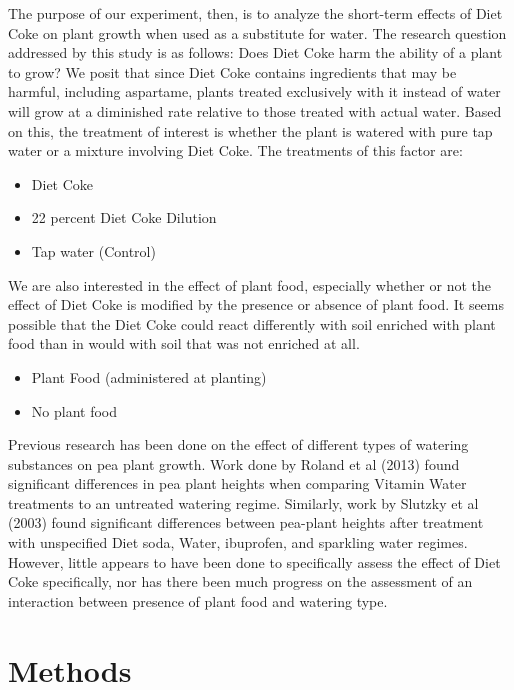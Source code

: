 \documentclass[1p,12pt]{elsarticle}\usepackage[]{graphicx}\usepackage[]{color}
\begin{document}
The purpose of our experiment, then, is to analyze the short-term effects of Diet Coke on plant growth when used as a substitute for water. The research question addressed by this study is as follows: Does Diet Coke harm the ability of a plant to grow? We posit that since Diet Coke contains ingredients that may be harmful, including aspartame, plants treated exclusively with it instead of water will grow at
a diminished rate relative to those treated with actual water. Based on this, the treatment of interest is whether the plant is watered with pure tap water or a mixture involving Diet Coke. The treatments of this factor are:

\begin{itemize}
\item Diet Coke
\item 22 percent Diet Coke Dilution
\item Tap water (Control)
\end{itemize}

We are also interested in the effect of plant food,  especially whether or not the effect of Diet Coke is modified by the presence or absence of plant food.  It seems possible that the Diet Coke could react differently with soil enriched with plant food than in would with soil that was not enriched at all. 

\begin{itemize}
\item Plant Food (administered at planting)
\item No plant food
\end{itemize}

Previous research has been done on the effect of different types of watering substances on pea plant growth. Work done by Roland et al (2013) found significant differences in pea plant heights when comparing Vitamin Water treatments to an untreated watering regime. Similarly, work by Slutzky et al (2003) found significant differences between pea-plant heights after treatment with unspecified Diet soda, Water, ibuprofen, and sparkling water regimes. However, little appears to have been done to specifically assess the effect of Diet Coke specifically, nor has there been much progress on the assessment of an interaction between presence of plant food and watering type.   



\section{Methods}
\end{document}
